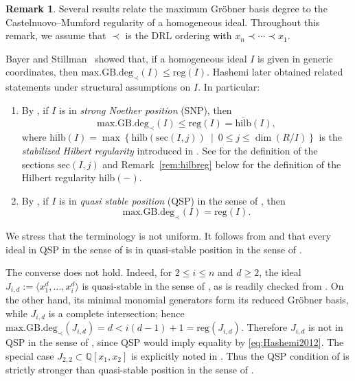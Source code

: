 \documentclass{article}
\theoremstyle{definition}
\newtheorem{remark}[theorem]{Remark}
\theoremstyle{plain}
\theoremstyle{plain}
\theoremstyle{plain}
\theoremstyle{plain}
\numberwithin{equation}{subsection}
\begin{document}
\begin{remark}\label{rem:regGB}
Several results relate the maximum Gr\"obner basis degree to the Castelnuovo--Mumford regularity of a homogeneous ideal.
Throughout this remark, we assume that $\prec$ is the DRL ordering \textcolor{black}{with $x_n \prec \cdots \prec x_1$}.

Bayer and Stillman~\cite{BS} showed that, if a homogeneous ideal $I$ is given in generic coordinates, then $\mathrm{max.GB.deg}_{\prec}(I) \le \mathrm{reg}(I)$.
Hashemi later obtained related statements under structural assumptions on $I$.
In particular:
\begin{enumerate}
\item[(1)] By \cite[Theorem 4.17]{Hashemi2010}, if $I$ is in \emph{strong Noether position} (SNP), then
\begin{equation}\label{eq:Hashemi2010}
    \mathrm{max.GB.deg}_{\prec}(I) \le \mathrm{reg}(I)
= \overline{\mathrm{hilb}}(I),
\end{equation}
where $\overline{\mathrm{hilb}}(I) =
\max\left\{
\mathrm{hilb}(\mathrm{sec}(I,j))
\ \middle|\
0\leq j\leq\dim(R/I)
\right\}$ is the \emph{stabilized Hilbert regularity} introduced in
\cite{Hashemi2010}.
See \cite{Hashemi2010} for the definition of the sections $\mathrm{sec}(I,j)$ and Remark~\ref{rem:hilbreg} below for the definition of the Hilbert regularity $\mathrm{hilb}(-)$.

\item[(2)] By \cite[Theorem~4.1]{Hashemi2012}, if $I$ is in \emph{quasi stable position} (QSP) in the sense of \cite{Hashemi2012}, then
\begin{equation}\label{eq:Hashemi2012}
\mathrm{max.GB.deg}_{\prec}(I)=\mathrm{reg}(I).
\end{equation}
\end{enumerate}
We stress that the terminology is not uniform.
It follows from \cite[Lemma~3.1]{Hashemi2012} and \cite[Definition~3.1 and Proposition~3.2(v)]{HSS18} that every ideal in QSP in the sense of \cite{Hashemi2012} is in quasi-stable position in the sense of \cite{HSS18}.

The converse does not hold.
Indeed, for $2\leq i\leq n$ and $d\geq2$, the ideal $J_{i,d}:=\langle x_1^d,\ldots,x_i^d\rangle$ is quasi-stable in the sense of \cite{HSS18}, as is readily checked from \cite[Definition~3.1(i)]{HSS18}.
On the other hand, its minimal monomial generators form its reduced Gr\"obner basis, while $J_{i,d}$ is a complete intersection; hence $\mathrm{max.GB.deg}_{\prec}(J_{i,d})=d<i(d-1)+1=\mathrm{reg}(J_{i,d})$.
Therefore $J_{i,d}$ is not in QSP in the sense of \cite{Hashemi2012}, since QSP would imply equality by \eqref{eq:Hashemi2012}.
The special case $J_{2,2}\subset\mathbb Q[x_1,x_2]$ is explicitly noted in \cite[p.~1171]{Hashemi2012}.
Thus the QSP condition of \cite{Hashemi2012} is strictly stronger than quasi-stable position in the sense of \cite{HSS18}.


\end{remark}
\end{document}
